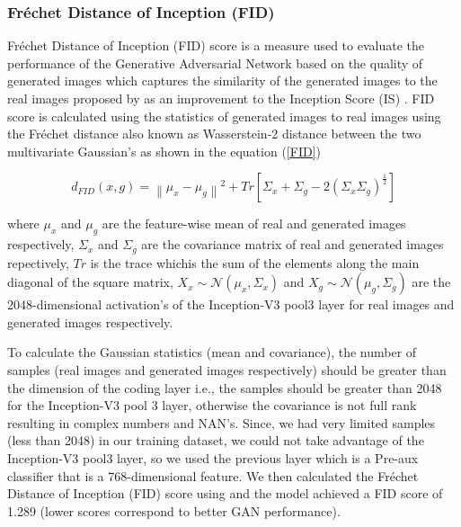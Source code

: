 \documentclass{article}
\begin{document}
\subsubsection*{Fréchet Distance of Inception (FID)}

Fréchet Distance of Inception (FID) score is a measure used to evaluate the performance of the Generative Adversarial Network based on the quality of generated images which captures the similarity of the generated images to the real images proposed by \cite{heusel2017gans} as an improvement to the Inception Score (IS) \cite{salimans2016improved}. FID score is calculated using the statistics of generated images to real images using the Fréchet distance also known as Wasserstein-2 distance between the two multivariate Gaussian's as shown in the equation (\ref{FID})

\begin{equation}
{d_{FID}}(x,g) = {\left\| {{\mu _x} - {\mu _g}} \right\|^2} + Tr\left[ {{\Sigma _x} + {\Sigma _g} - 2{{\left( {{\Sigma _x}{\Sigma _g}} \right)}^{\frac{1}{2}}}} \right]
\label{FID} 
\end{equation}

where ${\mu _x}$ and ${\mu _g}$ are the feature-wise mean of real and generated images respectively, ${\Sigma _x}$ and ${\Sigma _g}$ are the covariance matrix of real and generated images repectively, $Tr$ is the trace whichis the sum of the elements along the main diagonal of the square matrix, $X_{x} \sim \mathcal{N}(\mu _x, \Sigma _x)$ and $X_{g} \sim \mathcal{N}(\mu _g, \Sigma _g)$ are the 2048-dimensional activation's of the Inception-V3 pool3 layer for real images and generated images respectively. 
\par
To calculate the Gaussian statistics (mean and covariance), the number of samples (real images and generated images respectively) should be greater than the dimension of the coding layer i.e., the samples should be greater than 2048 for the Inception-V3 pool 3 layer, otherwise the covariance is not full rank resulting in complex numbers and NAN's.  Since, we had very limited samples (less than 2048) in our training dataset, we could not take advantage of the Inception-V3 pool3 layer, so we used the previous layer which is a Pre-aux classifier that is a 768-dimensional feature. We then calculated the Fréchet Distance of Inception (FID) score using \cite{pytorchf86:online} and the model achieved a FID score of 1.289 (lower scores correspond to better GAN performance).
\end{document}
